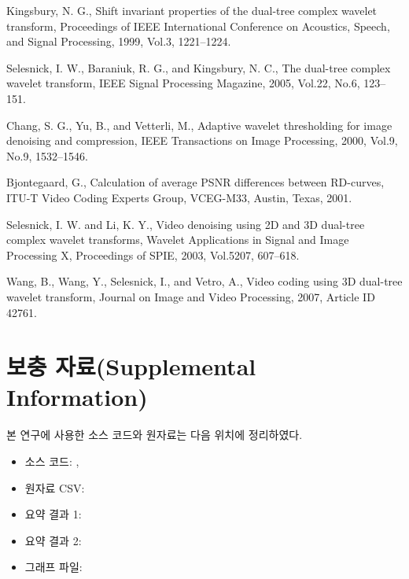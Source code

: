 \documentclass[10pt]{article}
\begin{document}
\noindent[2] Kingsbury, N. G., Shift invariant properties of the dual-tree complex wavelet transform, Proceedings of IEEE International Conference on Acoustics, Speech, and Signal Processing, 1999, Vol.3, 1221--1224.

\noindent[3] Selesnick, I. W., Baraniuk, R. G., and Kingsbury, N. C., The dual-tree complex wavelet transform, IEEE Signal Processing Magazine, 2005, Vol.22, No.6, 123--151.

\noindent[4] Chang, S. G., Yu, B., and Vetterli, M., Adaptive wavelet thresholding for image denoising and compression, IEEE Transactions on Image Processing, 2000, Vol.9, No.9, 1532--1546.

\noindent[5] Bjontegaard, G., Calculation of average PSNR differences between RD-curves, ITU-T Video Coding Experts Group, VCEG-M33, Austin, Texas, 2001.

\noindent[6] Selesnick, I. W. and Li, K. Y., Video denoising using 2D and 3D dual-tree complex wavelet transforms, Wavelet Applications in Signal and Image Processing X, Proceedings of SPIE, 2003, Vol.5207, 607--618.

\noindent[7] Wang, B., Wang, Y., Selesnick, I., and Vetro, A., Video coding using 3D dual-tree wavelet transform, Journal on Image and Video Processing, 2007, Article ID 42761.

\section*{\large \bf 보충 자료(Supplemental Information)}
본 연구에 사용한 소스 코드와 원자료는 다음 위치에 정리하였다.
\begin{itemize}
    \item 소스 코드: , 
    \item 원자료 CSV: 
    \item 요약 결과 1: 
    \item 요약 결과 2: 
    \item 그래프 파일: 
\end{itemize}
\end{document}
